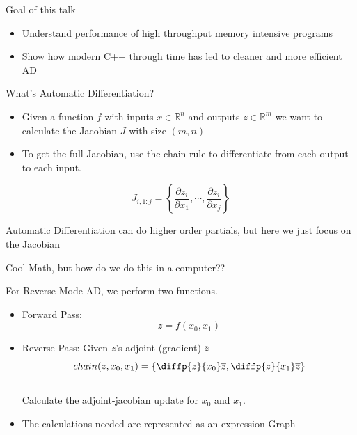 \documentclass[dvipsnames]{beamer}
\newcommand{\fracp}[2]{\frac{\partial #1}{\partial #2}}
\begin{document}
\begin{frame}{Goal of this talk}
\begin{itemize}
    \item Understand performance of high throughput memory intensive programs
    \item Show how modern C++ through time has led to cleaner and more efficient AD
\end{itemize}
\end{frame}


\begin{frame}{What's Automatic Differentiation?}

\begin{itemize}
    \item Given a function $f$ with inputs $x\in\mathbb{R}^n$ and outputs $z\in \mathbb{R}^m$ we want to calculate the Jacobian $J$ with size $(m, n)$
    \item To get the full Jacobian, use the chain rule to differentiate from each output to each input.
\end{itemize}


\begin{equation*}
    J_{i, 1:j} = \left\{\fracp{z_i}{x_1}, \cdots, \fracp{z_i}{x_j}\right\}
\end{equation*}

Automatic Differentiation can do higher order partials, but here we just focus on the Jacobian
    
\end{frame}

\begin{frame}{Cool Math, but how do we do this in a computer??}

 For Reverse Mode AD, we perform two functions.

\begin{itemize}
 \item Forward Pass: 
 \begin{equation*}
     z = f(x_0, x_1)
 \end{equation*}
 \item Reverse Pass: Given $z$'s adjoint (gradient) $\overline{z}$
 \begin{equation*}
 chain(z, x_0, x_{1}) = \left\{\diffp{z}{{x_0}}\overline{z},\diffp{z}{{x_1}}\overline{z}\right\}     
 \end{equation*}
 \\Calculate the adjoint-jacobian update for $x_0$ and $x_1$.
 \item The calculations needed are represented as an expression Graph
\end{itemize}
\end{frame} 
\end{document}
